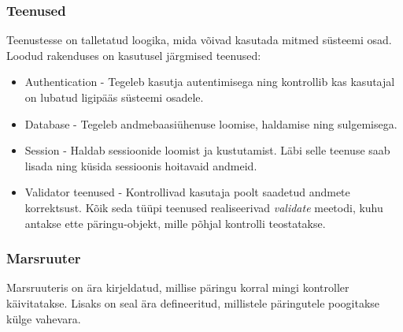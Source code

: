 \documentclass[a4paper,12pt]{article} %
\begin{document}
\subsubsection{Teenused}
Teenustesse on talletatud loogika, mida võivad kasutada mitmed süsteemi osad. Loodud rakenduses on kasutusel järgmised teenused:
\begin{itemize}
\item Authentication - Tegeleb kasutja autentimisega ning kontrollib kas kasutajal on lubatud ligipääs süsteemi osadele.
\item Database - Tegeleb andmebaasiühenuse loomise, haldamise ning sulgemisega.
\item Session - Haldab sessioonide loomist ja kustutamist. Läbi selle teenuse saab lisada ning küsida sessioonis hoitavaid andmeid.
\item Validator teenused - Kontrollivad kasutaja poolt saadetud andmete korrektsust. Kõik seda tüüpi teenused realiseerivad \textit{validate} meetodi, kuhu antakse ette päringu-objekt, mille põhjal kontrolli teostatakse.
\end{itemize}

\subsubsection{Marsruuter}
Marsruuteris on ära kirjeldatud, millise päringu korral mingi kontroller käivitatakse. Lisaks on seal ära defineeritud, millistele päringutele poogitakse külge vahevara.

\end{document}
